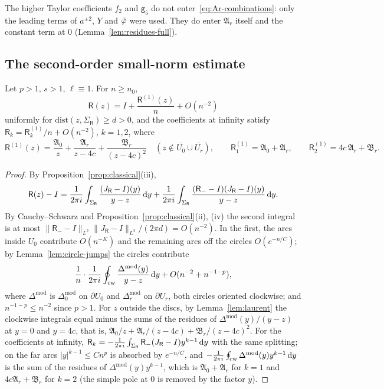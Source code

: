 The higher Taylor coefficients $f_2$ and $\mathsf g_5$ do not enter~\eqref{eq:Ar-combinations}: only the leading terms of
$a^{\pm2}$, $Y$ and $\tilde\varphi$ were used. They do enter $\mathfrak A_r$ itself and the constant term at $0$
(Lemma~\ref{lem:residues-full}).

\subsection{The second-order small-norm estimate}\label{sec:second-small}

\begin{proposition}\label{prop:second}
Let $p>1$, $s>1$, $\ell\equiv1$. For $n\ge n_0$,
\[
  \mathsf R(z)=I+\frac{\mathsf R^{(1)}(z)}n+O(n^{-2})
\]
uniformly for $\mathrm{dist}(z,\Sigma_{\mathsf R})\ge d>0$, and the coefficients at infinity satisfy $\mathsf R_k=\mathsf R_k^{(1)}/n+O(n^{-2})$,
$k=1,2$, where
\[
  \mathsf R^{(1)}(z)=\frac{\mathfrak A_0}z+\frac{\mathfrak A_r}{z-4c}+\frac{\mathfrak B_r}{(z-4c)^2}\quad(z\notin\overline{U_0}\cup\overline{U_r}),\qquad
  \mathsf R_1^{(1)}=\mathfrak A_0+\mathfrak A_r,\qquad \mathsf R_2^{(1)}=4c\,\mathfrak A_r+\mathfrak B_r .
\]
\end{proposition}

\begin{proof}
By Proposition~\ref{prop:classical}(iii),
\[
  \mathsf R(z)-I=\frac1{2\pi i}\int_{\Sigma_{\mathsf R}}\frac{(J_{\mathsf R}-I)(y)}{y-z}\,\mathrm{d} y
  +\frac1{2\pi i}\int_{\Sigma_{\mathsf R}}\frac{(\mathsf R_--I)(J_{\mathsf R}-I)(y)}{y-z}\,\mathrm{d} y .
\]
By Cauchy--Schwarz and Proposition~\ref{prop:classical}(ii), (iv) the second integral is at most
$\|\mathsf R_--I\|_{L^2}\|J_{\mathsf R}-I\|_{L^2}/(2\pi d)=O(n^{-2})$. In the first, the arcs inside $U_0$ contribute
$O(n^{-K})$ and the remaining arcs off the circles $O(e^{-n/C})$; by Lemma~\ref{lem:circle-jumps} the circles contribute
\[
  \frac1n\cdot\frac1{2\pi i}\oint_{\mathrm{cw}}\frac{\Delta^{\mathrm{mod}}(y)}{y-z}\,\mathrm{d} y+O(n^{-2}+n^{-1-p}),
\]
where $\Delta^{\mathrm{mod}}$ is $\Delta_0^{\mathrm{mod}}$ on $\partial U_0$ and $\Delta_r^{\mathrm{mod}}$ on $\partial U_r$, both circles
oriented clockwise; and $n^{-1-p}\le n^{-2}$ since $p>1$. For $z$ outside the discs, by Lemma~\ref{lem:laurent} the
clockwise integrals equal minus the sums of the residues of $\Delta^{\mathrm{mod}}(y)/(y-z)$ at $y=0$ and $y=4c$, that is,
$\mathfrak A_0/z+\mathfrak A_r/(z-4c)+\mathfrak B_r/(z-4c)^2$. For the coefficients at infinity,
$\mathsf R_k=-\frac1{2\pi i}\int_{\Sigma_{\mathsf R}}\mathsf R_-(J_{\mathsf R}-I)y^{k-1}\,\mathrm{d} y$ with the same splitting; on the far arcs
$|y|^{k-1}\le Cn^p$ is absorbed by $e^{-n/C}$, and $-\frac1{2\pi i}\oint_{\mathrm{cw}}\Delta^{\mathrm{mod}}(y)y^{k-1}\,\mathrm{d} y$ is the sum of the
residues of $\Delta^{\mathrm{mod}}(y)y^{k-1}$, which is $\mathfrak A_0+\mathfrak A_r$ for $k=1$ and $4c\mathfrak A_r+\mathfrak B_r$ for $k=2$
(the simple pole at $0$ is removed by the factor $y$).
\end{proof}

